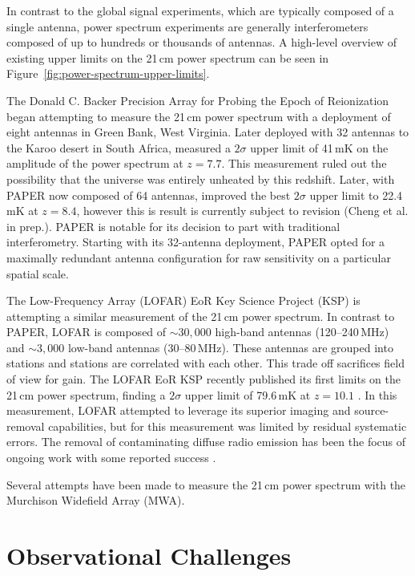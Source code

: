\begin{bibunit}
In contrast to the global signal experiments, which are typically composed of a single antenna,
power spectrum experiments are generally interferometers composed of up to hundreds or thousands of
antennas. A high-level overview of existing upper limits on the 21\,cm power spectrum can be seen in
Figure~\ref{fig:power-spectrum-upper-limits}.


The Donald C. Backer Precision Array for Probing the Epoch of Reionization
\citep[PAPER;][]{2010AJ....139.1468P} began attempting to measure the 21\,cm power spectrum with a
deployment of eight antennas in Green Bank, West Virginia. Later deployed with 32 antennas to the
Karoo desert in South Africa, \citet{2014ApJ...788..106P} measured a $2\sigma$ upper limit of 41\,mK
on the amplitude of the power spectrum at $z=7.7$. This measurement ruled out the possibility that
the universe was entirely unheated by this redshift.  Later, with PAPER now composed of 64 antennas,
\citet{2015ApJ...809...61A} improved the best $2\sigma$ upper limit to 22.4\,mK at $z=8.4$, however
this is result is currently subject to revision (Cheng et al. in prep.). PAPER is notable for its
decision to part with traditional interferometry. Starting with its 32-antenna deployment, PAPER
opted for a maximally redundant antenna configuration for raw sensitivity on a particular spatial
scale.

The Low-Frequency Array (LOFAR) EoR Key Science Project (KSP) is attempting a similar measurement of
the 21\,cm power spectrum. In contrast to PAPER, LOFAR is composed of $\sim30,000$ high-band
antennas (120--240\,MHz) and $\sim3,000$ low-band antennas (30--80\,MHz). These antennas are grouped
into stations and stations are correlated with each other. This trade off sacrifices field of view
for gain. The LOFAR EoR KSP recently published its first limits on the 21\,cm power spectrum,
finding a $2\sigma$ upper limit of 79.6\,mK at $z=10.1$ \citep{2017ApJ...838...65P}. In this
measurement, LOFAR attempted to leverage its superior imaging and source-removal capabilities, but
for this measurement was limited by residual systematic errors. The removal of contaminating diffuse
radio emission has been the focus of ongoing work with some reported success \citep{koopmans_2017}.

Several attempts have been made to measure the 21\,cm power spectrum with the Murchison Widefield
Array (MWA).


\section{Observational Challenges}


\end{bibunit}
